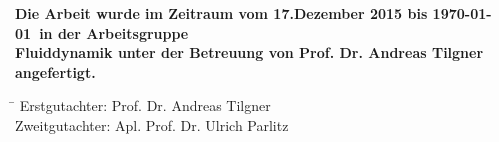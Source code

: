 \documentclass[11pt,a4paper,headsepline,bibliography=totoc,idxtotoc,DIV12,openright,twoside=true,chapterprefix=on]{scrbook}
\begin{document}
\mbox{}
\thispagestyle{empty}
\newpage
\newpage
{}
\thispagestyle{empty}
\vfill
\begin{otherlanguage}{ngerman}
\noindent \textbf{Die Arbeit wurde im Zeitraum vom 17.Dezember 2015 bis \today \ in der Arbeitsgruppe\\ Fluiddynamik
 unter der Betreuung von Prof. Dr. Andreas Tilgner angefertigt. }\\
\end{otherlanguage}

\vfill
\begin{tabbing}
  \hspace{3cm}\=\kill
   Erstgutachter: \quad  Prof. Dr. Andreas Tilgner\\
   Zweitgutachter: \quad  Apl. Prof. Dr. Ulrich Parlitz\\
\end{tabbing}

\newpage
\mbox{}
\thispagestyle{empty}
\newpage

\setcounter{page}{1}

\tableofcontents


\cleardoublepage

\setcounter{page}{1}










%
%




\newpage
\thispagestyle{empty}
\mbox{}

\begin{appendices}


\end{appendices}

\begingroup
\sloppy
\printbibliography
\endgroup



\clearpage\thispagestyle{empty}\mbox{}\clearpage


\end{document}
